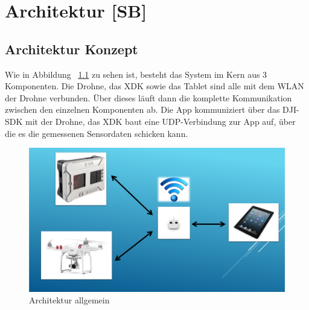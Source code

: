
\chapter{Architektur [SB]}\label{cha:Architektur}
\section{Architektur Konzept}\label{sec:Architektur Konzept}
Wie in Abbildung ~\ref{fig:Architektur_grob} zu sehen ist, besteht das System im Kern aus 3 Komponenten. Die Drohne, das \acs{XDK} sowie das Tablet sind alle mit dem \acs{WLAN} der Drohne verbunden. Über dieses läuft dann die komplette Kommunikation zwischen den einzelnen Komponenten ab. Die App kommuniziert über das \acs{DJI}-\acs{SDK} mit der Drohne, das \acs{XDK} baut eine UDP-Verbindung zur App auf, über die es die gemessenen Sensordaten schicken kann.
\begin{figure}[H]
	\includegraphics[width=\textwidth]{images/Architektur_grob.png}	
	\caption{Architektur allgemein}
	\label{fig:Architektur_grob}
\end{figure}

